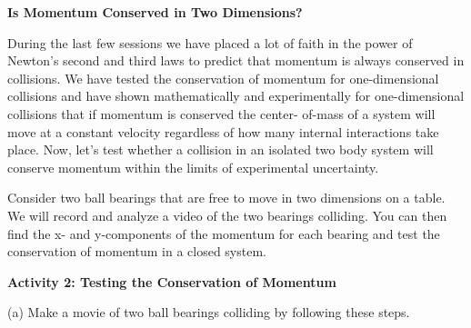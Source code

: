




\textbf{Is Momentum Conserved in Two Dimensions? }

During the last few sessions we have placed a lot of faith in the power of Newton's
second and third laws to predict that momentum is always conserved in collisions.
We have tested the conservation of momentum for one-dimensional collisions and
have shown mathematically and experimentally for one-dimensional collisions
that if momentum is conserved the center- of-mass of a system will move at a
constant velocity regardless of how many internal interactions take place. Now,
let's test whether a collision in an isolated two body system will conserve
momentum within the limits of experimental uncertainty. 

Consider two ball bearings that are free to move in two dimensions on a table.
We will record and analyze a video of the two bearings colliding. You can then
find the x- and y-components of the momentum for each bearing and test the 
conservation of momentum in a closed system. 

\textbf{Activity 2: Testing the Conservation of Momentum }

(a) Make a movie of two ball bearings colliding by following these steps. 

